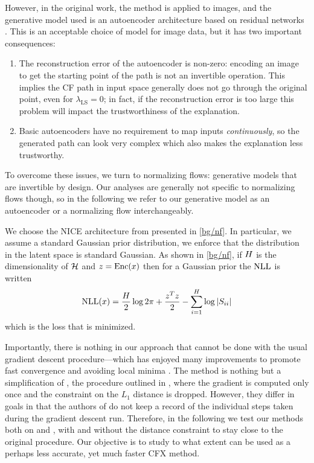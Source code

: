 \documentclass[../main.tex]{subfiles}
\begin{document}
However, in the original \ls{} work, the method is applied to images, and the generative model used is an autoencoder architecture based on residual networks \cite{heDeep2015}.
This is an acceptable choice of model for image data, but it has two important consequences:
\begin{enumerate}
	\item The reconstruction error of the autoencoder is non-zero: encoding an image to get the starting point of the path is not an invertible operation.
	      This implies the CF path in input space generally does not go through the original point, even for $\lambda_\text{LS} = 0$; in fact, if the reconstruction error is too large this problem will impact the trustworthiness of the explanation.

	\item Basic autoencoders have no requirement to map inputs \emph{continuously}, so the generated path can look very complex which also makes the explanation less trustworthy.
\end{enumerate}

To overcome these issues, we turn to normalizing flows: generative models that are invertible by design.
Our analyses are generally not specific to normalizing flows though, so in the following we refer to our generative model as an autoencoder or a normalizing flow interchangeably.

We choose the NICE architecture from \cite{dinhNICE2015} presented in \autoref{bg/nf}.
In particular, we assume a standard Gaussian prior distribution, \ie{} we enforce that the distribution in the latent space is standard Gaussian.
As shown in \autoref{bg/nf}, if $H$ is the dimensionality of $\mathcal{H}$ and $z = \operatorname{Enc}(x)$ then for a Gaussian prior the $\text{NLL}$ is written
\begin{align*}
\text{NLL}(x) = \frac{H}{2} \log 2 \pi
    +  \frac{z^T z}{2}
    - \sum_{i=1}^H \log \left\lvert S_{ii}\right\rvert
\end{align*}
which is the loss that is minimized.

Importantly, there is nothing in our approach that cannot be done with the usual gradient descent procedure---which has enjoyed many improvements to promote fast convergence and avoiding local minima \cite{kingmaAdam2014}.
The \ls{} method is nothing but a simplification of \revise{}, the procedure outlined in \cite{joshiRealistic2019},
where the gradient is computed only once and the constraint on the $L_1$ distance is dropped.
However, they differ in goals in that the authors of \cite{joshiRealistic2019} do not keep a record of the individual
steps taken during the gradient descent run.
Therefore, in the following we test our methods both on \ls{} and \revise{}, with and without the distance constraint
to stay close to the original \revise{} procedure.
Our objective is to study to what extent \ls{} can be used as a perhaps less accurate, yet much faster CFX method.
\end{document}
